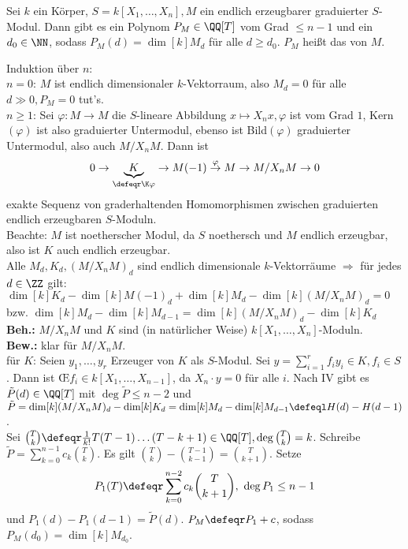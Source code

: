 \begin{Satz}
\label{Satz6}
  Sei $k$ ein Körper, $S=k[X_1, \dots, X_n], M$ ein endlich erzeugbarer
  graduierter $S$-Modul. Dann gibt es ein Polynom $P_M \in \QQ[T]$ vom
  Grad $\le n -1 $ und ein $d_0 \in \NN$, sodass $P_M(d) = \dim[k]{M_d}$ für alle $d \ge d_0$. $P_M$ heißt das
   von $M$.
\end{Satz}

\begin{Bew}
  Induktion über $n$:\\
  $n=0$: $M$ ist endlich dimensionaler $k$-Vektorraum, also $M_d=0$ für alle $d
  \gg 0, P_M = 0$ tut's.\\
  $n\geq 1$: Sei $\varphi: M \to M$ die $S$-lineare Abbildung $x \mapsto X_n x,
  \varphi$ ist vom Grad $1$, Kern$(\varphi)$ ist also graduierter Untermodul,
  ebenso ist Bild$(\varphi)$ graduierter Untermodul, also auch $M/X_n M$.
  Dann ist
  \[
  0 \to \underset{\defeqr\K \varphi}{\underbrace{K}} \to M(-1) \overset{\varphi}{\to}
  M \to M/X_n M \to 0
  \]
  exakte Sequenz von graderhaltenden Homomorphismen zwischen graduierten\\
  endlich erzeugbaren $S$-Moduln.\\
  Beachte: $M$ ist noetherscher Modul, da $S$ noethersch und $M$ endlich
  erzeugbar, also ist $K$ auch endlich erzeugbar.\\
  Alle $M_d, K_d,(M/X_n M)_d$ sind endlich dimensionale $k$-Vektorräume
  $\Rightarrow$ für jedes $d \in \ZZ$ gilt: $\dim[k]{K_d} -
  \dim[k]{M(-1)_d} + \dim[k]{M_d} - \dim[k]{(M/X_n M)_d} = 0$
  bzw. $\dim[k]{M_d} - \dim[k]{M_{d-1}} = \dim[k]{(M/X_n M)_d}
  - \dim[k]{K_d}$\\
  \textbf{Beh.:} $M/X_n M$ und $K$ sind (in natürlicher Weise) $k[X_1, \dots,
  X_n]$-Moduln.\\
  \textbf{Bew.:} klar für $M/X_n M$.\\
  für $K$: Seien $y_1, \dots, y_r$ Erzeuger von $K$ als $S$-Modul. Sei $y =
  \sum_{i = 1}^r f_i y_i \in K, f_i \in S$.
  Dann ist \OE $f_i \in k[X_1, \dots, X_{n-1}]$, da $X_n \cdot y = 0$ für
  alle $i$. Nach IV gibt es $\tilde{P}(d) \in \QQ[T]$ mit $\deg{\tilde{P}}
  \le n-2$ und $\tilde{P} = \dim[k]{(M/X_n M)_d} - \dim[k]{K_d} =
  \dim[k]{M_d} - \dim[k]{M_{d-1}} \defeql H(d) - H(d-1)$.\\
  Sei $\binom{T}{k} \defeqr \frac{1}{k!} T (T-1) \dots (T-k+1) \in
  \QQ[T], \deg{\binom{T}{k}} = k$.
  Schreibe $\tilde{P} = \sum_{k = 0}^{n-1} c_k \binom{T}{k}$. Es gilt
  $\binom{T}{k} - \binom{T-1}{k-1} = \binom{T}{k+1}$. Setze
  \[
  P_1(T) \defeqr \sum_{k=0}^{n-2} c_k \binom{T}{k+1},\ \deg{P_1} \le n-1
  \]
  und $P_1(d)-P_1(d-1) = \tilde{P}(d)$. $P_M \defeqr P_1 +c$, sodass $P_M(d_0) =
  \dim[k]{M_{d_0}}$.
\end{Bew}


